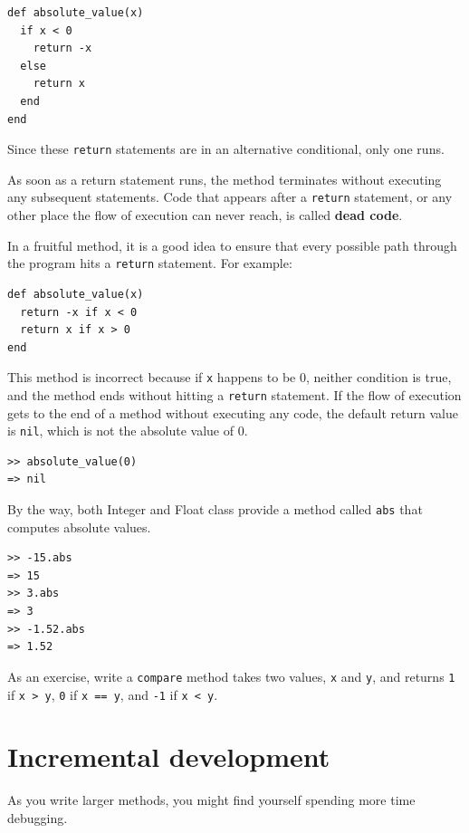 \documentclass[10pt]{book}
\begin{document}
\begin{verbatim}
def absolute_value(x)
  if x < 0
    return -x
  else
    return x
  end
end
\end{verbatim}
%
Since these {\tt return} statements are in an alternative conditional,
only one runs.

As soon as a return statement runs, the method
terminates without executing any subsequent statements.
Code that appears after a {\tt return} statement, or any other place
the flow of execution can never reach, is called {\bf dead code}.

In a fruitful method, it is a good idea to ensure
that every possible path through the program hits a
{\tt return} statement.  For example:

\begin{verbatim}
def absolute_value(x)
  return -x if x < 0
  return x if x > 0
end
\end{verbatim}
%
This method is incorrect because if {\tt x} happens to be 0,
neither condition is true, and the method ends without hitting a
{\tt return} statement.  If the flow of execution gets to the end
of a method without executing any code, the default return value
is {\tt nil}, which is not the absolute value of 0.

\begin{verbatim}
>> absolute_value(0)
=> nil
\end{verbatim}
%
By the way, both Integer and Float class provide a method called 
{\tt abs} that computes absolute values.

\begin{verbatim}
>> -15.abs
=> 15
>> 3.abs
=> 3
>> -1.52.abs
=> 1.52
\end{verbatim}

As an exercise, write a {\tt compare} method
takes two values, {\tt x} and {\tt y}, and returns {\tt 1} if {\tt x > y},
{\tt 0} if {\tt x == y}, and {\tt -1} if {\tt x < y}.


\section{Incremental development}
\label{incremental.development}

As you write larger methods, you might find yourself
spending more time debugging.
\end{document}
